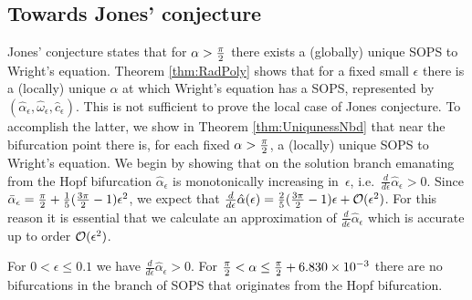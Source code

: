 





%
%
%



\subsection{Towards Jones' conjecture}
\label{s:Jones}

Jones' conjecture states that for $ \alpha > \tfrac{\pi}{2}$ there exists a (globally) unique SOPS to Wright's equation.
 Theorem \ref{thm:RadPoly} shows that for a fixed small $\epsilon$ there is a (locally) unique $\alpha$ at which Wright's equation has a SOPS, represented by
 $(\hat{\alpha}_\epsilon,\hat{\omega}_\epsilon,\hat{c}_\epsilon)$. 
This is not sufficient to prove the local case of Jones conjecture.
To accomplish the latter, we show in Theorem \ref{thm:UniqunessNbd} 
 that near the bifurcation point there is, for each fixed $\alpha>\tfrac{\pi}{2}$, a (locally) unique SOPS to Wright's equation. 
We begin by showing that on the solution branch emanating from the Hopf bifurcation 
$\hat{\alpha}_\epsilon$ is monotonically increasing in~$\epsilon$,
i.e.\ $ \tfrac{d}{d \epsilon} \hat{\alpha}_{\epsilon} >0$.  
Since $\bar{\alpha}_\epsilon = \tfrac{\pi}{2} + \tfrac{1}{5}(\tfrac{3 \pi}{2}-1) \epsilon^2  $,
we expect that $\tfrac{d}{d \epsilon} \hat{\alpha}(\epsilon) = \tfrac{2}{5}(\tfrac{3 \pi}{2}-1) \epsilon + \mathcal{O}(\epsilon^2)$. 
For this reason it is essential that we calculate an approximation of $\tfrac{d}{d \epsilon} \hat{\alpha}_\epsilon$ which is accurate up to order $ \mathcal{O}(\epsilon^2)$.   

\begin{theorem}
	\label{thm:NoFold}
For $0 < \epsilon \leq 0.1$ we have $ \tfrac{d}{d \epsilon} \hat{\alpha}_{\epsilon} >0$. 
For 
$\tfrac{\pi}{2}  < \alpha \leq \tfrac{\pi}{2} + 6.830  \times 10^{-3}$ 
there are no  bifurcations in the branch of SOPS that originates from the Hopf bifurcation. 
\end{theorem}

